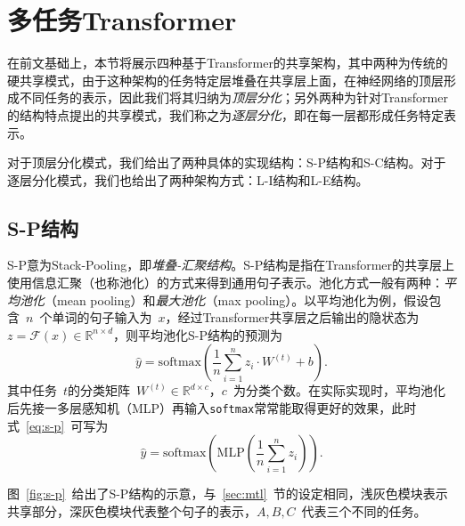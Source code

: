 \section{多任务Transformer}
\label{sec:mtl_tf}
在前文基础上，本节将展示四种基于Transformer的共享架构，其中两种为传统的硬共享模式，由于这种架构的任务特定层堆叠在共享层上面，在神经网络的顶层形成不同任务的表示，因此我们将其归纳为\emph{顶层分化}；另外两种为针对Transformer的结构特点提出的共享模式，我们称之为\emph{逐层分化}，即在每一层都形成任务特定表示。

对于顶层分化模式，我们给出了两种具体的实现结构：S-P结构和S-C结构。对于逐层分化模式，我们也给出了两种架构方式：L-I结构和L-E结构。

\subsection{S-P结构}
S-P意为Stack-Pooling，即\emph{堆叠-汇聚结构}。S-P结构是指在Transformer的共享层上使用信息汇聚（也称池化）的方式来得到通用句子表示。池化方式一般有两种：\emph{平均池化}（mean pooling）和\emph{最大池化}（max pooling）。以平均池化为例，假设包含~$n$~个单词的句子输入为~$x$，经过Transformer共享层之后输出的隐状态为~$z = \mathcal{F}(x) \in \mathbb{R}^{n \times d}$，则平均池化S-P结构的预测为
\begin{equation}
	\hat{y} = \mathrm{softmax}(\frac{1}{n}\sum_{i=1}^{n}z_i\cdot W^{(t)} + b).
	\label{eq:s-p}
\end{equation}
其中任务~$t$的分类矩阵~$W^{(t)}\in \mathbb{R}^{d\times c}$，$c$~为分类个数。在实际实现时，平均池化后先接一多层感知机（MLP）再输入\texttt{softmax}常常能取得更好的效果，此时式~\ref{eq:s-p}~可写为
\begin{equation}
	\hat{y} = \mathrm{softmax}(\mathrm{MLP}(\frac{1}{n}\sum_{i=1}^{n}z_i)).
\end{equation}

图~\ref{fig:s-p}~给出了S-P结构的示意，与~\ref{sec:mtl}~节的设定相同，浅灰色模块表示共享部分，深灰色模块代表整个句子的表示，$A,B,C$~代表三个不同的任务。

